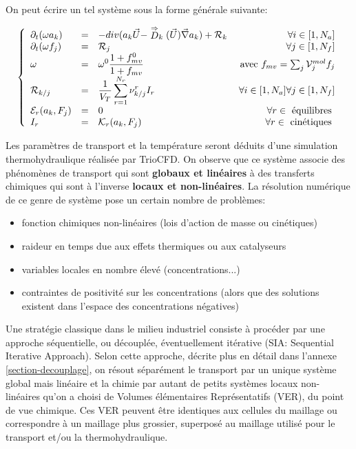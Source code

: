 On peut \'ecrire un tel syst\`eme sous la forme g\'en\'erale suivante: 

$$
\left\{
\begin{array}{lclr}
\partial _t(\omega a_k)  & = &  \displaystyle -div(a_k
 \vec{U} - \stackrel{\Rightarrow}{D}_k 
 (\vec{U}) \vec{\nabla} a_k ) + {\cal R}_k &
 \forall i \in [1,N_a]\\
\partial _t(\omega f_j)  & = & {\cal R}_j &
 \forall j \in [1,N_f]\\
\omega  & = & \displaystyle \omega ^0
\frac{1+f_{mv}^0}{1+f_{mv}} & \mbox{ avec }  f_{mv} = \sum _j {\cal V}_j^{mol} f_j \\
{\cal R}_{k/j} & = & \displaystyle \frac{1}{V_T} \sum _{r=1}^{N_r}
{\nu}_{k/j}^r I_r &
 \forall i \in [1,N_a]
 \forall j \in [1,N_f] \\
{\cal E}_{r} ( a_k , F_j ) & = & 0 & \forall r \in \mbox{ \'equilibres } \\
I_r & = & {\cal K}_{r} ( a_k , F_j  ) & \forall r \in \mbox{ cin\'etiques }
\end{array}
\right.
$$

Les param\`etres de transport et la temp\'erature seront d\'eduits d'une simulation thermohydraulique r\'ealis\'ee par TrioCFD.  
On observe que ce syst\`eme associe des ph\'enom\`enes de transport qui sont {\bf globaux et lin\'eaires} \`a des transferts chimiques qui sont \`a l'inverse {\bf locaux et non-lin\'eaires}. La r\'esolution num\'erique de ce genre de syst\`eme pose un certain nombre de probl\`emes: 

\begin{itemize}
\item fonction chimiques non-lin\'eaires (lois d'action de masse ou cin\'etiques) 
\item raideur en temps due aux effets thermiques ou aux catalyseurs
\item variables locales en nombre \'elev\'e (concentrations...)
\item contraintes de positivit\'e sur les concentrations (alors que des solutions existent dans l'espace des concentrations n\'egatives)
\end{itemize}

Une strat\'egie classique dans le milieu industriel consiste \`a proc\'eder par une approche s\'equentielle, ou d\'ecoupl\'ee, \'eventuellement it\'erative (SIA: Sequential Iterative Approach). 
Selon cette approche, d\'ecrite plus en d\'etail dans l'annexe \ref{section-decouplage}, on r\'esout s\'epar\'ement le transport par un unique syst\`eme global mais lin\'eaire et la chimie par 
autant de petits syst\`emes locaux non-lin\'eaires qu'on a choisi de Volumes \'el\'ementaires Repr\'esentatifs (VER), du point de vue chimique. Ces VER peuvent \^etre identiques aux 
cellules du maillage ou correspondre \`a un maillage plus grossier, superpos\'e au maillage utilis\'e pour le transport et/ou la thermohydraulique. 

